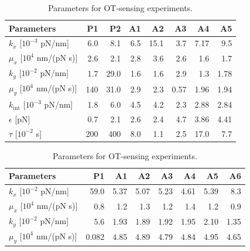 \begin{table}[h]
    \centering
    \small
    \begin{minipage}{0.47\textwidth}
        \centering
        \begin{tabular}{l rrrrrrr}
            \toprule
            \textbf{Parameters} & \textbf{P1} & \textbf{P2} & \textbf{A1} & \textbf{A2} & \textbf{A3} & \textbf{A4} & \textbf{A5} \\
            \midrule
            $k_x$ [$10^{-3}$ pN/nm] & 6.0 & 8.1 & 6.5 & 15.1 & 3.7 & 7.17 & 9.5 \\
            $\mu_x$ [$10^4$ nm/(pN s)] & 2.6 & 2.1 & 2.8 & 3.6 & 2.6 & 1.6 & 1.7 \\
            $k_y$ [$10^{-2}$ pN/nm] & 1.7 & 29.0 & 1.6 & 1.6 & 2.9 & 1.3 & 1.78 \\
            $\mu_y$ [$10^4$ nm/(pN s)] & 140 & 31.0 & 2.9 & 2.3 & 0.57 & 1.96 & 1.94 \\
            $k_{\text{int}}$ [$10^{-3}$ pN/nm] & 1.8 & 6.0 & 4.5 & 4.2 & 2.3 & 2.88 & 2.84 \\
            $\epsilon$ [pN] & 0.7 & 2.1 & 2.6 & 2.4 & 4.7 & 3.86 & 4.41 \\
            $\tau$ [$10^{-2}$ s] & 200 & 400 & 8.0 & 1.1 & 2.5 & 17.0 & 7.7 \\
            \bottomrule
        \end{tabular}
        \caption{Parameters for OT-sensing experiments.}
        \label{stab:RBC_parameter_OT_ss}
    \end{minipage}
    \hspace{0.002\textwidth} %
    \begin{minipage}{0.48\textwidth}
        \centering
        \begin{tabular}{l rrrrrrr}
            \toprule
            \textbf{Parameters} & \textbf{P1} & \textbf{A1} & \textbf{A2} & \textbf{A3} & \textbf{A4} & \textbf{A5} & \textbf{A6} \\
            \midrule
            $k_x$ [$10^{-2}$ pN/nm] & 59.0 & 5.37 & 5.07 & 5.23 & 4.61 & 5.39 & 8.3 \\
            $\mu_x$ [$10^4$ nm/(pN s)] & 0.8 & 1.2 & 1.3 & 1.2 & 1.4 & 1.2 & 0.9 \\
            $k_y$ [$10^{-2}$ pN/nm] & 5.6 & 1.93 & 1.89 & 1.92 & 1.95 & 2.10 & 1.35 \\
            $\mu_y$ [$10^4$ nm/(pN s)] & 0.082 & 4.85 & 4.89 & 4.79 & 4.84 & 4.95 & 4.65 \\

\end{tabular}
\end{minipage}
\end{table}
